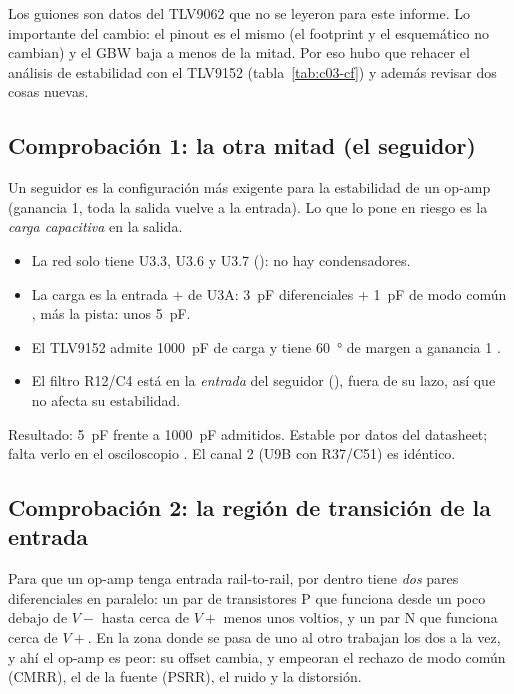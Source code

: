Los guiones son datos del TLV9062 que no se leyeron para este informe. Lo importante del cambio: el pinout es el mismo
(el footprint y el esquemático no cambian) y el GBW baja a menos de la mitad. Por eso hubo que rehacer el análisis de
estabilidad con el TLV9152 (tabla~\ref{tab:c03-cf}) y además revisar dos cosas nuevas.

\subsection{Comprobación 1: la otra mitad (el seguidor)}

Un seguidor es la configuración más exigente para la estabilidad de un op-amp (ganancia 1, toda la salida vuelve a la
entrada). Lo que lo pone en riesgo es la \emph{carga capacitiva} en la salida.

\begin{calculo}
\begin{itemize}
  \item La red  solo tiene U3.3, U3.6 y U3.7 (): no hay condensadores.
  \item La carga es la entrada $+$ de U3A: \SI{3}{\pico\farad} diferenciales + \SI{1}{\pico\farad} de modo común
        , más la pista: unos \SI{5}{\pico\farad}.
  \item El TLV9152 admite \SI{1000}{\pico\farad} de carga y tiene \SI{60}{\degree} de margen a ganancia 1
        .
  \item El filtro R12/C4 está en la \emph{entrada} del seguidor (), fuera de su lazo, así que no afecta su
        estabilidad.
\end{itemize}
Resultado: \SI{5}{\pico\farad} frente a \SI{1000}{\pico\farad} admitidos. Estable por datos del datasheet; falta verlo
en el osciloscopio \medir. El canal 2 (U9B con R37/C51) es idéntico.
\end{calculo}

\subsection{Comprobación 2: la región de transición de la entrada}\label{sec:c03-transicion}

\begin{idea}
Para que un op-amp tenga entrada rail-to-rail, por dentro tiene \emph{dos} pares diferenciales en paralelo: un par de
transistores P que funciona desde un poco debajo de $V-$ hasta cerca de $V+$ menos unos voltios, y un par N que
funciona cerca de $V+$. En la zona donde se pasa de uno al otro trabajan los dos a la vez, y ahí el op-amp es peor: su
offset cambia, y empeoran el rechazo de modo común (CMRR), el de la fuente (PSRR), el ruido y la distorsión.
\end{idea}

